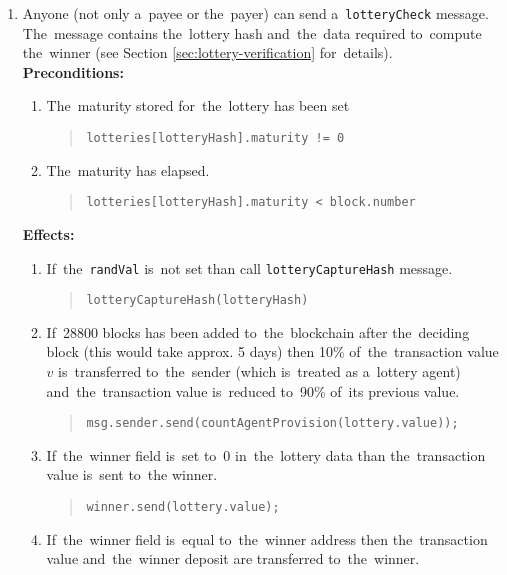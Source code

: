 \documentclass[a4paper]{article}
\begin{document}
\begin{enumerate}
        \item Anyone (not only a~payee or the~payer) can send a~\texttt{lotteryCheck} message. The~message contains
            the~lottery hash and~the~data required to~compute the~winner (see Section \ref{sec:lottery-verification}
            for~details).\\
            \textbf{Preconditions:}
            \begin{enumerate}
            \item The~maturity stored for~the~lottery has been set
              \begin{quote}
                \verb|lotteries[lotteryHash].maturity != 0|
              \end{quote}
            \item The~maturity has elapsed.
	      \begin{quote}
                \verb|lotteries[lotteryHash].maturity < block.number|
              \end{quote}
	    \end{enumerate}
	    \textbf{Effects:}
	    \begin{enumerate}
            \item If~the~\texttt{randVal} is~not set than call \texttt{lotteryCaptureHash} message.
              \begin{quote}
                \verb|lotteryCaptureHash(lotteryHash)|
              \end{quote}
            \item If~28800 blocks has been added to~the~blockchain after the~deciding block (this would take
              approx. 5 days) then 10\% of~the~transaction value $v$ is~transferred to~the~sender (which is~treated
              as a~lottery agent) and~the~transaction value is~reduced to~90\% of~its previous value.
              \begin{quote}
                \verb|msg.sender.send(countAgentProvision(lottery.value));|
              \end{quote}
            \item If~the~winner field is~set to~0 in~the~lottery data than the~transaction value is~sent to~the
              winner.
              \begin{quote}
                \verb|winner.send(lottery.value);|
              \end{quote}
            \item If~the~winner field is~equal to~the~winner address then the~transaction value and~the~winner
              deposit are transferred to~the~winner.

\end{enumerate}
\end{enumerate}
\end{document}
